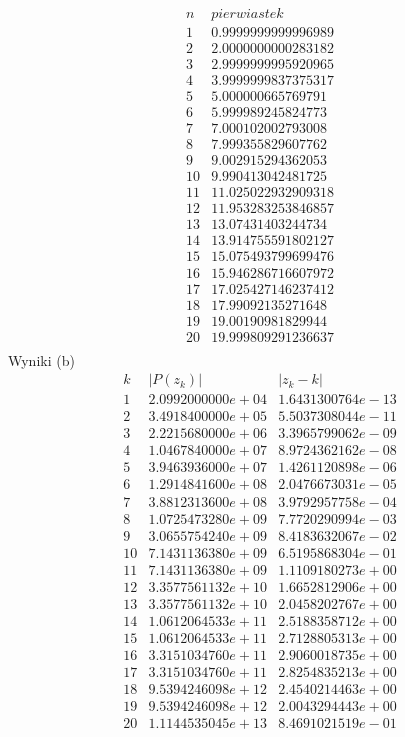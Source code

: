 $$
\begin{array}{c|c}
n & pierwiastek\\
\hline
1 & 0.9999999999996989\\
2 & 2.0000000000283182\\
3 & 2.9999999995920965\\
4 & 3.9999999837375317\\
5 & 5.000000665769791\\
6 & 5.999989245824773\\
7 & 7.000102002793008\\
8 & 7.999355829607762\\
9 & 9.002915294362053\\
10 & 9.990413042481725\\
11 & 11.025022932909318\\
12 & 11.953283253846857\\
13 & 13.07431403244734\\
14 & 13.914755591802127\\
15 & 15.075493799699476\\
16 & 15.946286716607972\\
17 & 17.025427146237412\\
18 & 17.99092135271648\\
19 & 19.00190981829944\\
20 & 19.999809291236637\\
\end{array}
$$
Wyniki (b)
$$
\begin{array}{c|c|c}
k & |P(z_k)| & |z_k - k|\\
\hline
1 & 2.0992000000e+04 & 1.6431300764e-13\\
2 & 3.4918400000e+05 & 5.5037308044e-11\\
3 & 2.2215680000e+06 & 3.3965799062e-09\\
4 & 1.0467840000e+07 & 8.9724362162e-08\\
5 & 3.9463936000e+07 & 1.4261120898e-06\\
6 & 1.2914841600e+08 & 2.0476673031e-05\\
7 & 3.8812313600e+08 & 3.9792957758e-04\\
8 & 1.0725473280e+09 & 7.7720290994e-03\\
9 & 3.0655754240e+09 & 8.4183632067e-02\\
10 & 7.1431136380e+09 & 6.5195868304e-01\\
11 & 7.1431136380e+09 & 1.1109180273e+00\\
12 & 3.3577561132e+10 & 1.6652812906e+00\\
13 & 3.3577561132e+10 & 2.0458202767e+00\\
14 & 1.0612064533e+11 & 2.5188358712e+00\\
15 & 1.0612064533e+11 & 2.7128805313e+00\\
16 & 3.3151034760e+11 & 2.9060018735e+00\\
17 & 3.3151034760e+11 & 2.8254835213e+00\\
18 & 9.5394246098e+12 & 2.4540214463e+00\\
19 & 9.5394246098e+12 & 2.0043294443e+00\\
20 & 1.1144535045e+13 & 8.4691021519e-01\\
\end{array}
$$
